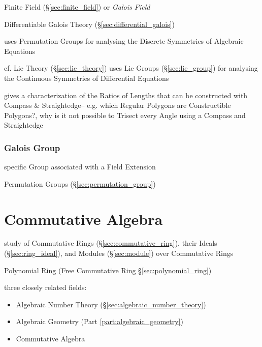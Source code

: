 Finite Field (\S\ref{sec:finite_field}) or \emph{Galois Field}

Differentiable Galois Theory (\S\ref{sec:differential_galois})

uses Permutation Groups for analysing the Discrete Symmetries of
Algebraic Equations %

cf. Lie Theory (\S\ref{sec:lie_theory}) uses Lie Groups
(\S\ref{sec:lie_group}) for analysing the Continuous Symmetries of
Differential Equations

gives a characterization of the Ratios of Lengths that can be constructed with
Compass \& Straightedge-- e.g. which Regular Polygons are Constructible
Polygons?, why is it not possible to Trisect every Angle using a Compass and
Straightedge



\subsubsection{Galois Group}\label{sec:galois_group}

specific Group associated with a Field Extension %

Permutation Groups (\S\ref{sec:permutation_group})



\section{Commutative Algebra}\label{sec:commutative_algebra}

study of Commutative Rings (\S\ref{sec:commutative_ring}), their Ideals
(\S\ref{sec:ring_ideal}), and Modules (\S\ref{sec:module}) over Commutative
Rings

Polynomial Ring (Free Commutative Ring \S\ref{sec:polynomial_ring})

three closely related fields:
\begin{itemize}
  \item Algebraic Number Theory (\S\ref{sec:algebraic_number_theory})
  \item Algebraic Geometry (Part \ref{part:algebraic_geometry})
  \item Commutative Algebra
\end{itemize}

